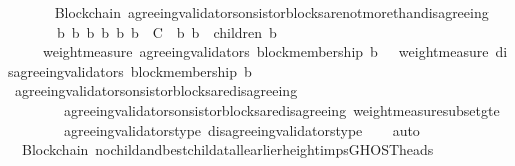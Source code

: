 \begin{isabellebody}
\isamarkupfalse%
%
\endisatagproof
{\isafoldproof}%
%
\isadelimproof
\ \ \ \ \isanewline
%
\endisadelimproof
\isanewline
{}\isamarkupfalse%
\ {\isacharparenleft}\ Blockchain{\isacharparenright}\ agreeing{\isacharunderscore}validators{\isacharunderscore}on{\isacharunderscore}sistor{\isacharunderscore}blocks{\isacharunderscore}are{\isacharunderscore}not{\isacharunderscore}more{\isacharunderscore}than{\isacharunderscore}disagreeing\ {\isacharcolon}\isanewline
\ \ {\isachardoublequoteopen}{\isasymforall}\ {\isasymsigma}\ {\isasymin}\ {\isasymSigma}{\isachardot}\ {\isasymforall}\ b\ b{}\ b{}{\isachardot}\ {\isacharbraceleft}b{\isacharcomma}\ b{}{\isacharcomma}\ b{}{\isacharbraceright}\ {\isasymsubseteq}\ C\ {\isasymand}\ {\isacharbraceleft}b{}{\isacharcomma}\ b{}{\isacharbraceright}\ {\isasymsubseteq}\ children\ {\isacharparenleft}b{\isacharcomma}\ {\isasymsigma}{\isacharparenright}\ \isanewline
\ \ \ {\isasymlongrightarrow}\ \ weight{\isacharunderscore}measure\ {\isacharparenleft}agreeing{\isacharunderscore}validators\ {\isacharparenleft}block{\isacharunderscore}membership\ b{}{\isacharcomma}\ {\isasymsigma}{\isacharparenright}{\isacharparenright}\ {\isasymle}\ weight{\isacharunderscore}measure\ {\isacharparenleft}disagreeing{\isacharunderscore}validators\ {\isacharparenleft}block{\isacharunderscore}membership\ b{}{\isacharcomma}\ {\isasymsigma}{\isacharparenright}{\isacharparenright}{\isachardoublequoteclose}\isanewline
%
\isadelimproof
\ \ %
\endisadelimproof
%
\isatagproof
{}\isamarkupfalse%
\ agreeing{\isacharunderscore}validators{\isacharunderscore}on{\isacharunderscore}sistor{\isacharunderscore}blocks{\isacharunderscore}are{\isacharunderscore}disagreeing\isanewline
\ \ \ \ \ \ \ \ agreeing{\isacharunderscore}validators{\isacharunderscore}on{\isacharunderscore}sistor{\isacharunderscore}blocks{\isacharunderscore}are{\isacharunderscore}disagreeing\ weight{\isacharunderscore}measure{\isacharunderscore}subset{\isacharunderscore}gte\isanewline
\ \ \ \ \ \ \ \ agreeing{\isacharunderscore}validators{\isacharunderscore}type\ disagreeing{\isacharunderscore}validators{\isacharunderscore}type\isanewline
\ \ \isamarkupfalse%
\ auto%
\endisatagproof
{\isafoldproof}%
%
\isadelimproof
\isanewline
%
\endisadelimproof
\isanewline
{}\isamarkupfalse%
\ {\isacharparenleft}\ Blockchain{\isacharparenright}\ no{\isacharunderscore}child{\isacharunderscore}and{\isacharunderscore}best{\isacharunderscore}child{\isacharunderscore}at{\isacharunderscore}all{\isacharunderscore}earlier{\isacharunderscore}height{\isacharunderscore}imps{\isacharunderscore}GHOST{\isacharunderscore}heads\ {\isacharcolon}\isanewline

\end{isabellebody}
